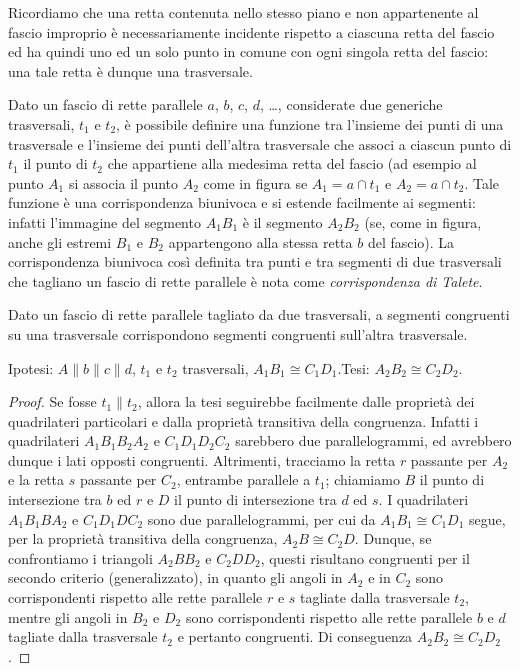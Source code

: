 Ricordiamo che una retta contenuta nello stesso piano e non appartenente al fascio improprio è necessariamente incidente rispetto a ciascuna retta del fascio ed ha quindi uno ed un solo punto in comune con ogni singola retta del fascio: una tale retta è dunque una trasversale.

Dato un fascio di rette parallele $a$, $b$, $c$, $d$, \ldots{}, considerate due generiche trasversali, $t_1$ e $t_2$, è possibile definire una funzione tra l'insieme dei punti di una trasversale e l'insieme dei punti dell'altra trasversale che associ a ciascun punto di $t_1$ il punto di $t_2$ che appartiene alla medesima retta del fascio (ad esempio al punto $A_1$ si associa il punto $A_2$ come in figura se $A_1 = a \cap t_1$ e $A_2 = a \cap t_2$. Tale funzione è una corrispondenza biunivoca e si estende facilmente ai segmenti: infatti l'immagine del segmento $A_1B_1$ è il segmento $A_2B_2$ (se, come in figura, anche gli estremi $B_1$ e $B_2$ appartengono alla stessa retta $b$ del fascio).
La corrispondenza biunivoca così definita tra punti e tra segmenti di due trasversali che tagliano un fascio di rette parallele è nota come \emph{corrispondenza di Talete}.

\begin{teorema}
Dato un fascio di rette parallele tagliato da due trasversali, a segmenti congruenti su una trasversale corrispondono segmenti congruenti sull’altra trasversale.
\end{teorema}

\noindent Ipotesi: $A\parallel b\parallel c\parallel d$, $t_1$ e $t_2$ trasversali, $A_1B_1\cong C_1D_1$.\tab Tesi: $A_2B_2\cong C_2D_2$.

\begin{proof}
Se fosse $t_1\parallel t_2$, allora la tesi seguirebbe facilmente dalle proprietà dei quadrilateri particolari e dalla proprietà transitiva della congruenza. Infatti i quadrilateri $A_1B_1B_2A_2$ e $C_1D_1D_2C_2$ sarebbero due parallelogrammi, ed avrebbero dunque i lati opposti congruenti.
Altrimenti, tracciamo la retta $r$ passante per $A_2$ e la retta $s$ passante per $C_2$, entrambe parallele a $t_1$; chiamiamo $B$ il punto di intersezione tra $b$ ed $r$ e $D$ il punto di intersezione tra $d$ ed $s$.
I quadrilateri $A_1B_1BA_2$ e $C_1D_1DC_2$ sono due parallelogrammi, per cui da $A_1B_1\cong C_1D_1$ segue, per la proprietà transitiva della congruenza, $A_2B\cong C_2D$. Dunque, se confrontiamo i triangoli $A_2BB_2$ e $C_2DD_2$, questi risultano congruenti per il secondo criterio (generalizzato), in quanto gli angoli in $A_2$ e in $C_2$ sono corrispondenti rispetto alle rette parallele $r$ e $s$ tagliate dalla trasversale $t_2$, mentre gli angoli in $B_2$ e $D_2$ sono corrispondenti rispetto alle rette parallele $b$ e $d$ tagliate dalla trasversale $t_2$ e pertanto congruenti. Di conseguenza $A_2B_2\cong C_2D_2$.
\end{proof}

